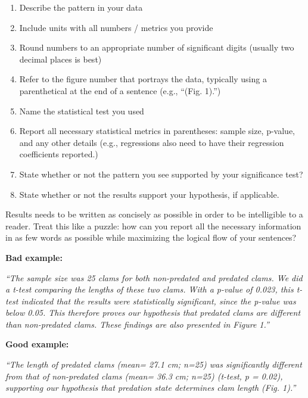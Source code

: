 \documentclass[]{book}
\providecommand{\tightlist}{%
  \setlength{\itemsep}{0pt}\setlength{\parskip}{0pt}}
\begin{document}
\begin{enumerate}
\def\labelenumi{\arabic{enumi}.}
\tightlist
\item
  Describe the pattern in your data\\
\item
  Include units with all numbers / metrics you provide\\
\item
  Round numbers to an appropriate number of significant digits (usually two decimal places is best)\\
\item
  Refer to the figure number that portrays the data, typically using a parenthetical at the end of a sentence (e.g., ``(Fig. 1).'')\\
\item
  Name the statistical test you used\\
\item
  Report all necessary statistical metrics in parentheses: sample size, p-value, and any other details (e.g., regressions also need to have their regression coefficients reported.)\\
\item
  State whether or not the pattern you see supported by your significance test?
\item
  State whether or not the results support your hypothesis, if applicable.
\end{enumerate}

Results needs to be written as concisely as possible in order to be intelligible to a reader. Treat this like a puzzle: how can you report all the necessary information in as few words as possible while maximizing the logical flow of your sentences?

\textbf{Bad example:}

\emph{``The sample size was 25 clams for both non-predated and predated clams. We did a t-test comparing the lengths of these two clams. With a p-value of 0.023, this t-test indicated that the results were statistically significant, since the p-value was below 0.05. This therefore proves our hypothesis that predated clams are different than non-predated clams. These findings are also presented in Figure 1.''}

\textbf{Good example:}

\emph{``The length of predated clams (mean= 27.1 cm; n=25) was significantly different from that of non-predated clams (mean= 36.3 cm; n=25) (t-test, p = 0.02), supporting our hypothesis that predation state determines clam length (Fig. 1).''}
\end{document}
